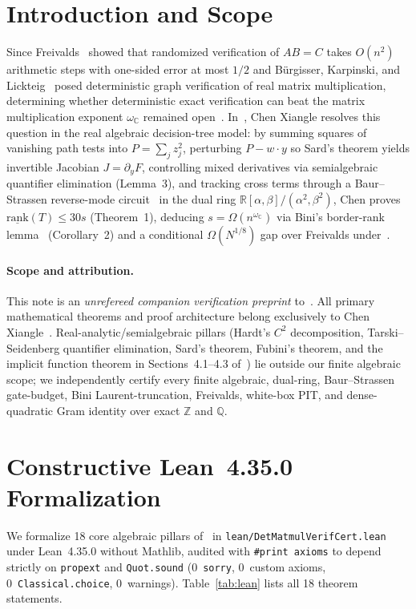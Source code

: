 \documentclass[10pt,twocolumn]{article}
\begin{document}
\section{Introduction and Scope}
Since Freivalds~\cite{Freivalds1979Fast} showed that randomized verification of $AB = C$ takes $O(n^2)$ arithmetic steps with one-sided error at most $1/2$ and B\"urgisser, Karpinski, and Lickteig~\cite{BurgisserKarpinskiLickteig1992} posed deterministic graph verification of real matrix multiplication, determining whether deterministic exact verification can beat the matrix multiplication exponent $\omega_{\mathbb{C}}$ remained open~\cite{Kunnemann2018Freivalds}. In~\cite{Chen2026DetVerif}, Chen Xiangle resolves this question in the real algebraic decision-tree model: by summing squares of vanishing path tests into $P = \sum_j z_j^2$, perturbing $P - w\cdot y$ so Sard's theorem yields invertible Jacobian $J = \partial_y F$, controlling mixed derivatives via semialgebraic quantifier elimination (Lemma~3), and tracking cross terms through a Baur--Strassen reverse-mode circuit~\cite{BaurStrassen1983} in the dual ring $\mathbb{R}[\alpha,\beta]/(\alpha^2,\beta^2)$, Chen proves $\underline{\mathrm{rank}}(T) \le 30s$ (Theorem~1), deducing $s = \Omega(n^{\omega_{\mathbb{C}}})$ via Bini's border-rank lemma~\cite{Bini1980BorderRank} (Corollary~2) and a conditional $\Omega(N^{1/8})$ gap over Freivalds under~\cite{OpenAI2026NineFourths}.

\paragraph{Scope and attribution.}
This note is an \emph{unrefereed companion verification preprint} to~\cite{Chen2026DetVerif}. All primary mathematical theorems and proof architecture belong exclusively to Chen Xiangle~\cite{Chen2026DetVerif}. Real-analytic/semialgebraic pillars (Hardt's $C^2$ decomposition, Tarski--Seidenberg quantifier elimination, Sard's theorem, Fubini's theorem, and the implicit function theorem in Sections~4.1--4.3 of~\cite{Chen2026DetVerif}) lie outside our finite algebraic scope; we independently certify every finite algebraic, dual-ring, Baur--Strassen gate-budget, Bini Laurent-truncation, Freivalds, white-box PIT, and dense-quadratic Gram identity over exact $\mathbb{Z}$ and $\mathbb{Q}$.

\section{Constructive Lean~4.35.0 Formalization}
We formalize 18 core algebraic pillars of~\cite{Chen2026DetVerif} in \texttt{lean/DetMatmulVerifCert.lean} under Lean~4.35.0 without Mathlib, audited with \texttt{\#print axioms} to depend strictly on \texttt{propext} and \texttt{Quot.sound} (0~\texttt{sorry}, 0~custom axioms, 0~\texttt{Classical.choice}, 0~warnings). Table~\ref{tab:lean} lists all 18 theorem statements.
\end{document}
